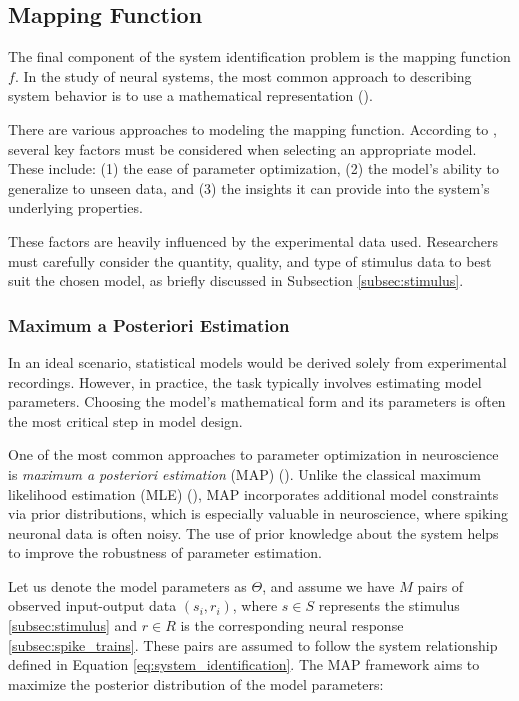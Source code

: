 \subsection{Mapping Function}
\label{subsec:mapping_function}

The final component of the system identification problem is the mapping function $f$. In the study of neural systems, the most common approach to describing system behavior is to use a mathematical representation (\citet{annurev:/content/journals/10.1146/annurev-vision-091718-014731}).

There are various approaches to modeling the mapping function. According to \citet{annurev:/content/journals/10.1146/annurev-vision-091718-014731}, several key factors must be considered when selecting an appropriate model. These include: (1) the ease of parameter optimization, (2) the model's ability to generalize to unseen data, and (3) the insights it can provide into the system's underlying properties.

These factors are heavily influenced by the experimental data used. Researchers must carefully consider the quantity, quality, and type of stimulus data to best suit the chosen model, as briefly discussed in Subsection \ref{subsec:stimulus}.

\subsubsection{Maximum a Posteriori Estimation}
\label{subsubsec:map_estimation}

In an ideal scenario, statistical models would be derived solely from experimental recordings. However, in practice, the task typically involves estimating model parameters. Choosing the model's mathematical form and its parameters is often the most critical step in model design.

One of the most common approaches to parameter optimization in neuroscience is \emph{maximum a posteriori estimation} (MAP) (\citet{wu2006complete, annurev:/content/journals/10.1146/annurev-vision-091718-014731}). Unlike the classical maximum likelihood estimation (MLE) (\citet{alpaydin2020introduction}), MAP incorporates additional model constraints via prior distributions, which is especially valuable in neuroscience, where spiking neuronal data is often noisy. The use of prior knowledge about the system helps to improve the robustness of parameter estimation.

Let us denote the model parameters as $\Theta$, and assume we have $M$ pairs of observed input-output data $(s_i, r_i)$, where $s \in S$ represents the stimulus \ref{subsec:stimulus} and $r \in R$ is the corresponding neural response \ref{subsec:spike_trains}. These pairs are assumed to follow the system relationship defined in Equation \ref{eq:system_identification}. The MAP framework aims to maximize the posterior distribution of the model parameters:

